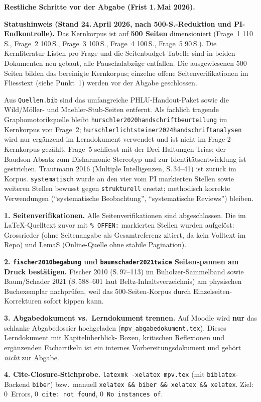\documentclass[ngerman, a4paper]{article}
\begin{document}
\begin{todomai}
\textbf{Restliche Schritte vor der Abgabe (Frist 1.\,Mai 2026).}

\medskip
\textbf{Statushinweis (Stand 24.\,April 2026, nach 500-S.-Reduktion und
PI-Endkontrolle).}
Das Kernkorpus ist auf \textbf{500 Seiten} dimensioniert (Frage~1 110\,S.,
Frage~2 100\,S., Frage~3 100\,S., Frage~4 100\,S., Frage~5 90\,S.). Die
Kernliteratur-Listen pro Frage und die Seitenbudget-Tabelle sind in beiden
Dokumenten neu gebaut, alle Pauschalabzüge entfallen. Die ausgewiesenen
500\,Seiten bilden das bereinigte Kernkorpus; einzelne offene
Seitenverifikationen im Fliesstext (siehe Punkt~1) werden vor der Abgabe
geschlossen.

Aus \texttt{Quellen.bib} sind das umfangreiche PHLU-Handout-Paket sowie die
Wild/Möller- und Maehler-Stub-Seiten entfernt. Als fachlich tragende
Graphomotorikquelle bleibt \texttt{hurschler2020handschriftbeurteilung} im
Kernkorpus von Frage~2; \texttt{hurschlerlichtsteiner2024handschriftanalysen}
wird nur ergänzend im Lerndokument verwendet und ist nicht im
Frage-2-Kernkorpus gezählt. Frage~5 schliesst mit der Drei-Haltungen-Trias;
der Baudson-Absatz zum Disharmonie-Stereotyp und zur Identitätsentwicklung
ist gestrichen. Trautmann 2016 (Multiple Intelligenzen, S.\,34--41) ist
zurück im Korpus. \texttt{systematisch} wurde an den vier vom PI markierten
Stellen sowie weiteren Stellen bewusst gegen \texttt{strukturell} ersetzt;
methodisch korrekte Verwendungen (\enquote{systematische Beobachtung},
\enquote{systematische Reviews}) bleiben.

\medskip
\textbf{1. Seitenverifikationen.}
Alle Seitenverifikationen sind abgeschlossen. Die im LaTeX-Quelltext
zuvor mit \texttt{\% OFFEN:} markierten Stellen wurden aufgelöst:
Grossrieder (ohne Seitenangabe als Gesamtreferenz zitiert, da kein Volltext
im Repo) und LemaS (Online-Quelle ohne stabile Pagination).

\medskip
\textbf{2. \texttt{fischer2010begabung} und \texttt{baumschader2021twice}
Seitenspannen am Druck bestätigen.}
Fischer 2010 (S.\,97--113) im Buholzer-Sammelband sowie Baum/Schader 2021
(S.\,588--601 laut Beltz-Inhaltsverzeichnis) am physischen Buchexemplar
nachprüfen, weil das 500-Seiten-Korpus durch Einzelseiten-Korrekturen
sofort kippen kann.

\medskip
\textbf{3. Abgabedokument vs.\ Lerndokument trennen.}
Auf Moodle wird \textbf{nur} das schlanke Abgabedossier hochgeladen
(\texttt{mpv\_abgabedokument.tex}). Dieses Lerndokument mit Kapitelüberblick-
Boxen, kritischen Reflexionen und ergänzenden Fachartikeln ist ein
internes Vorbereitungsdokument und gehört \textit{nicht} zur Abgabe.

\medskip
\textbf{4. Cite-Closure-Stichprobe.}
\verb|latexmk -xelatex mpv.tex| (mit \texttt{biblatex}-Backend
\texttt{biber}) bzw.\ manuell
\verb|xelatex && biber && xelatex && xelatex|. Ziel: 0~Errors,
0~\verb|cite: not found|, 0~\verb|No instances of|.
\end{todomai}
\end{document}

